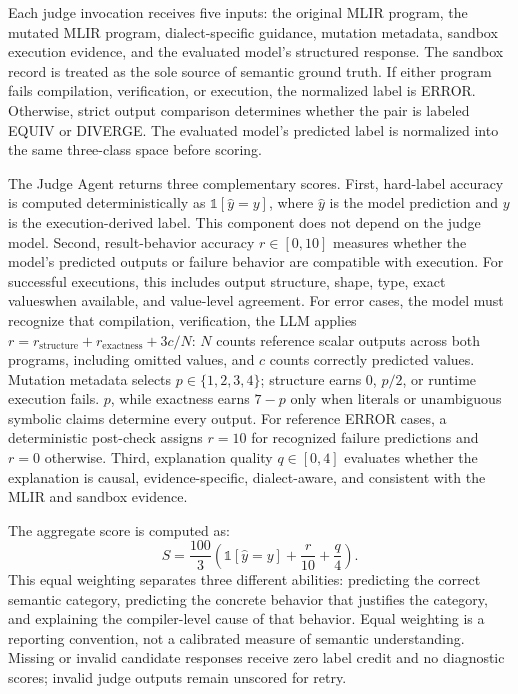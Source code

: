 \documentclass[sigplan,screen,review,anonymous]{acmart}
\providecommand{\DIFadd}[1]{{\protect\color{blue} \sf #1}} %
\providecommand{\DIFdel}[1]{{\protect\color{red} \scriptsize #1}} %
\providecommand{\DIFaddbegin}{} %
\providecommand{\DIFaddend}{} %
\providecommand{\DIFdelbegin}{} %
\providecommand{\DIFdelend}{} %
\begin{document}
Each judge invocation receives \DIFdelbegin \DIFdel{five inputs: }\DIFdelend the original MLIR program, the mutated MLIR program, dialect-specific guidance, mutation metadata, \DIFaddbegin \DIFadd{sandbox execution evidence, }\DIFaddend and the evaluated model's structured response. The sandbox record is treated as the sole source of semantic ground truth. If either program fails compilation, verification, or execution, the normalized label is \textsc{ERROR}. Otherwise, strict output comparison determines whether the pair is labeled \textsc{EQUIV} or \textsc{DIVERGE}. The evaluated model's predicted label is normalized into the same three-class space before scoring.

The Judge Agent returns three complementary scores. First, hard-label accuracy is computed deterministically as $\mathbb{1}[\hat{y}=y]$, where $\hat{y}$ is the model prediction and $y$ is the execution-derived label. This component does not depend on the judge model. Second, result-behavior accuracy $r \in [0,10]$ measures whether the model's predicted outputs or failure behavior are compatible with execution. For successful executions, \DIFdelbegin \DIFdel{this includes output structure, shape, type, exact valueswhen available, and value-level agreement. For error cases, the model must recognize that compilation, verification, }\DIFdelend \DIFaddbegin \DIFadd{the LLM applies $r=r_{\mathrm{structure}}+r_{\mathrm{exactness}}+3c/N$: $N$ counts reference scalar outputs across both programs, including omitted values, and $c$ counts correctly predicted values. Mutation metadata selects $p\in\{1,2,3,4\}$; structure earns $0$, $p/2$, }\DIFaddend or \DIFdelbegin \DIFdel{runtime execution fails. }\DIFdelend \DIFaddbegin \DIFadd{$p$, while exactness earns $7-p$ only when literals or unambiguous symbolic claims determine every output. For reference \textsc{ERROR} cases, a deterministic post-check assigns $r=10$ for recognized failure predictions and $r=0$ otherwise. }\DIFaddend Third, explanation quality $q \in [0,4]$ evaluates whether the explanation is causal, evidence-specific, dialect-aware, and consistent with the MLIR and sandbox evidence.

The aggregate score is computed as:
\[
S = \frac{100}{3}
\left(
\mathbb{1}[\hat{y}=y] + \frac{r}{10} + \frac{q}{4}
\right).
\]
\DIFdelbegin \DIFdel{This equal weighting separates three different abilities: predicting the correct semantic category, predicting the concrete behavior that justifies the category, and explaining the compiler-level cause of that behavior. }\DIFdelend \DIFaddbegin \DIFadd{Equal weighting is a reporting convention, not a calibrated measure of semantic understanding. Missing or invalid candidate responses receive zero label credit and no diagnostic scores; invalid judge outputs remain unscored for retry.
}\DIFaddend 
\end{document}
